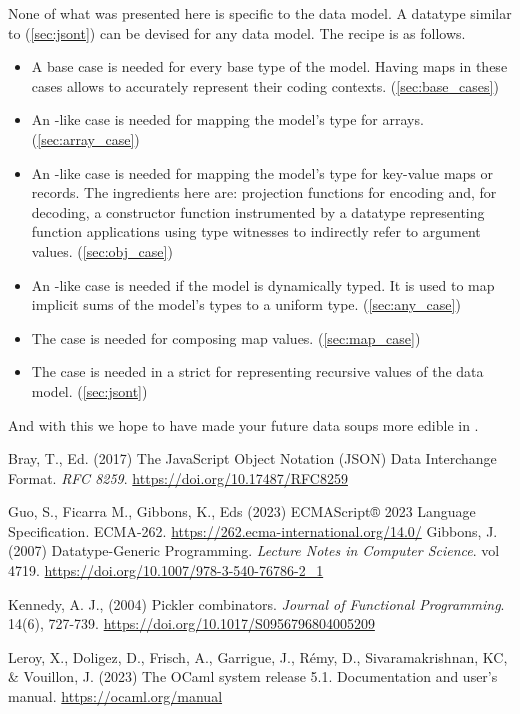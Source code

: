 \documentclass[nolinenum]{jfp}
\begin{document}
None of what was presented here is specific to the \json{} data
model. A datatype similar to  (\autoref{sec:jsont}) can be
devised for any data model. The recipe is as follows.
%
\begin{itemize}
\item A base case is needed for every base type of the model.  Having
  maps in these cases allows to accurately represent their coding contexts.
  (\autoref{sec:base_cases})
\item An -like case is needed for mapping the model's type for
  arrays. (\autoref{sec:array_case})
\item An -like case is needed for mapping the model's type for
  key-value maps or records. The \ml{} ingredients here are:
  projection functions for encoding and, for decoding, a constructor
  function instrumented by a datatype representing function applications
  using type witnesses to indirectly refer to argument values.
  (\autoref{sec:obj_case})
\item An -like case is needed if the model is dynamically
  typed. It is used to map implicit sums of the model's types to
  a uniform \ml{} type. (\autoref{sec:any_case})
\item The  case is needed for composing map values.
  (\autoref{sec:map_case})
\item The  case is needed in a strict \ml{} for representing
  recursive values of the data model. (\autoref{sec:jsont})
\end{itemize}
%
And with this we hope to have made your future data soups more edible
in \ml{}.

\appendix

\begin{thebibliography}{}
  Bray, T., Ed. (2017)
  The JavaScript Object Notation (JSON) Data Interchange Format.
  {\it RFC 8259}.
  \url{https://doi.org/10.17487/RFC8259}

  Guo, S., Ficarra M., Gibbons, K., Eds (2023)
  ECMAScript® 2023 Language Specification. ECMA-262.
  \url{https://262.ecma-international.org/14.0/}
  Gibbons, J. (2007)
  Datatype-Generic Programming. {\it Lecture Notes in Computer Science}.
  vol 4719.
  \url{https://doi.org/10.1007/978-3-540-76786-2\_1}

  Kennedy, A. J., (2004)
  Pickler combinators. {\it Journal of Functional Programming}.
  14(6), 727-739.
  \url{https://doi.org/10.1017/S0956796804005209}

  Leroy, X., Doligez, D., Frisch, A., Garrigue, J., Rémy, D.,
  Sivaramakrishnan, KC, \& Vouillon, J. (2023)
  The OCaml system release 5.1. Documentation and user’s manual.
  \mbox{\url{https://ocaml.org/manual}}
\end{thebibliography}
\end{document}
